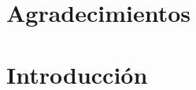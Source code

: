 \documentclass[a4paper,10pt]{book}
\theoremstyle{definition}
\begin{document}
\vfill
% 
% 
% 
% 


\chapter{Agradecimientos}

\chapter{Introducci\'on}
\end{document}
